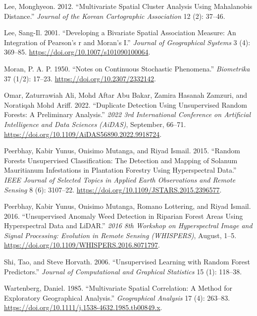 \documentclass[
  a4paper,
  12pt]{article}
\newlength{\cslhangindent}
\newenvironment{CSLReferences}[2] %
 {\begin{list}{}{%
  \setlength{\itemindent}{0pt}
  \setlength{\leftmargin}{0pt}
  \setlength{\parsep}{0pt}
  \ifodd #1
   \setlength{\leftmargin}{\cslhangindent}
   \setlength{\itemindent}{-1\cslhangindent}
  \fi
  \setlength{\itemsep}{#2\baselineskip}}}
 {\end{list}}
\begin{document}
\begin{CSLReferences}{1}{1}
Lee, Monghyeon. 2012. {``Multivariate Spatial Cluster Analysis Using
Mahalanobis Distance.''} \emph{Journal of the Korean Cartographic
Association} 12 (2): 37--46.

Lee, Sang-Il. 2001. {``Developing a Bivariate Spatial Association
Measure: An Integration of Pearson's r and Moran's I.''} \emph{Journal
of Geographical Systems} 3 (4): 369--85.
\url{https://doi.org/10.1007/s101090100064}.

Moran, P. A. P. 1950. {``Notes on Continuous Stochastic Phenomena.''}
\emph{Biometrika} 37 (1/2): 17--23.
\url{https://doi.org/10.2307/2332142}.

Omar, Zaturrawiah Ali, Mohd Aftar Abu Bakar, Zamira Hasanah Zamzuri, and
Noratiqah Mohd Ariff. 2022. {``Duplicate Detection Using Unsupervised
Random Forests: A Preliminary Analysis.''} \emph{2022 3rd International
Conference on Artificial Intelligence and Data Sciences (AiDAS)},
September, 66--71.
\url{https://doi.org/10.1109/AiDAS56890.2022.9918724}.

Peerbhay, Kabir Yunus, Onisimo Mutanga, and Riyad Ismail. 2015.
{``Random Forests Unsupervised Classification: The Detection and Mapping
of Solanum Mauritianum Infestations in Plantation Forestry Using
Hyperspectral Data.''} \emph{IEEE Journal of Selected Topics in Applied
Earth Observations and Remote Sensing} 8 (6): 3107--22.
\url{https://doi.org/10.1109/JSTARS.2015.2396577}.

Peerbhay, Kabir Yunus, Onisimo Mutanga, Romano Lottering, and Riyad
Ismail. 2016. {``Unsupervised Anomaly Weed Detection in Riparian Forest
Areas Using Hyperspectral Data and LiDAR.''} \emph{2016 8th Workshop on
Hyperspectral Image and Signal Processing: Evolution in Remote Sensing
(WHISPERS)}, August, 1--5.
\url{https://doi.org/10.1109/WHISPERS.2016.8071797}.

Shi, Tao, and Steve Horvath. 2006. {``Unsupervised Learning with Random
Forest Predictors.''} \emph{Journal of Computational and Graphical
Statistics} 15 (1): 118--38.

Wartenberg, Daniel. 1985. {``Multivariate Spatial Correlation: A Method
for Exploratory Geographical Analysis.''} \emph{Geographical Analysis}
17 (4): 263--83.
\url{https://doi.org/10.1111/j.1538-4632.1985.tb00849.x}.


\end{CSLReferences}
\end{document}
